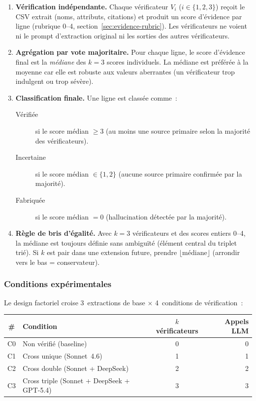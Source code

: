 \begin{enumerate}
\item \textbf{V\'erification ind\'ependante.} Chaque v\'erificateur $V_i$
  ($i \in \{1, 2, 3\}$) re\c{c}oit le CSV extrait (noms, attributs, citations)
  et produit un score d'\'evidence par ligne (rubrique 0--4,
  section~\ref{sec:evidence-rubric}). Les v\'erificateurs ne voient ni le prompt
  d'extraction original ni les sorties des autres v\'erificateurs.

\item \textbf{Agr\'egation par vote majoritaire.} Pour chaque ligne, le score
  d'\'evidence final est la \emph{m\'ediane} des $k=3$ scores individuels. La
  m\'ediane est pr\'ef\'er\'ee \`a la moyenne car elle est robuste aux valeurs
  aberrantes (un v\'erificateur trop indulgent ou trop s\'ev\`ere).

\item \textbf{Classification finale.} Une ligne est class\'ee comme~:
  \begin{description}
  \item[V\'erifi\'ee] si le score m\'edian $\geq 3$ (au moins une source primaire
    selon la majorit\'e des v\'erificateurs).
  \item[Incertaine] si le score m\'edian $\in \{1, 2\}$ (aucune source primaire
    confirm\'ee par la majorit\'e).
  \item[Fabriqu\'ee] si le score m\'edian $= 0$ (hallucination d\'etect\'ee par la
    majorit\'e).
  \end{description}

\item \textbf{R\`egle de bris d'\'egalit\'e.} Avec $k=3$ v\'erificateurs et des
  scores entiers 0--4, la m\'ediane est toujours d\'efinie sans ambigu\"it\'e
  (\'el\'ement central du triplet tri\'e). Si $k$ est pair dans une extension
  future, prendre $\lfloor \text{m\'ediane} \rfloor$ (arrondir vers le bas =
  conservateur).
\end{enumerate}

\subsubsection{Conditions exp\'erimentales}\label{sec:multi-verif-conditions}

Le design factoriel croise 3~extractions de base $\times$ 4~conditions de
v\'erification~:

\begin{center}
\small
\begin{tabular}{clcr}
\toprule
\textbf{\#} & \textbf{Condition} & \textbf{$k$ v\'erificateurs} & \textbf{Appels LLM} \\
\midrule
C0 & Non v\'erifi\'e (baseline)           & 0 & 0 \\
C1 & Cross unique (Sonnet~4.6)          & 1 & 1 \\
C2 & Cross double (Sonnet + DeepSeek)   & 2 & 2 \\
C3 & Cross triple (Sonnet + DeepSeek + GPT-5.4) & 3 & 3 \\
\bottomrule
\end{tabular}
\end{center}

